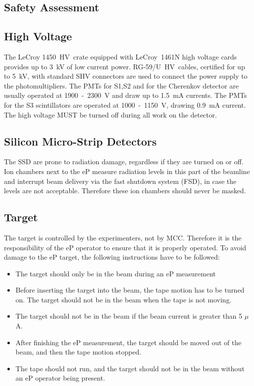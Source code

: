 \begin{safetyen}{0}{0}
\section {Safety Assessment}
\label{sec:ep_safety}

\subsection{High Voltage}

The LeCroy 1450~HV~crate equipped with LeCroy~1461N
high voltage cards provides up to 3~kV of low current power.
RG-59/U~HV~cables, certified for up to 5~kV, with standard SHV 
connectors are used to connect the power supply to the photomultipliers.
The PMTs for S1,S2 and for the Cherenkov detector are usually operated 
at 1900~-~2300~V and draw up to 1.5~mA currents. The PMTs for the 
S3 scintillators are operated at 1000~-~1150~V, drawing 0.9~mA current.
The high voltage MUST be turned off during all work on the detector.

\subsection{Silicon Micro-Strip Detectors}

The SSD are prone to radiation damage, regardless if they are 
turned on or off. Ion chambers next to the eP measure radiation levels
in this part of the beamline and interrupt beam delivery via the
fast shutdown system (FSD), in case the levels are not acceptable. Therefore these
ion chambers should never be masked. 

\subsection{Target}

The target is controlled by the experimenters, not by MCC. Therefore it is
the responsibility of the eP operator to ensure that it is properly
operated.
To avoid damage to the eP target, the following instructions have to be 
followed:
\begin{itemize}
\item The target should only be in the beam during an eP measurement
\item Before inserting the target into the beam, the tape motion has to
be turned on. The target should not be in the beam when the tape is not moving. 
\item The target should not be in the beam 
if the beam current is greater than 5 $\mu$A. 
\item After finishing the eP measurement, the target should be moved out
of the beam, and then the tape motion stopped. 
\item The tape should not run, and the target should not be in the beam
without an eP operator being present.
\end{itemize}


\end{safetyen}
